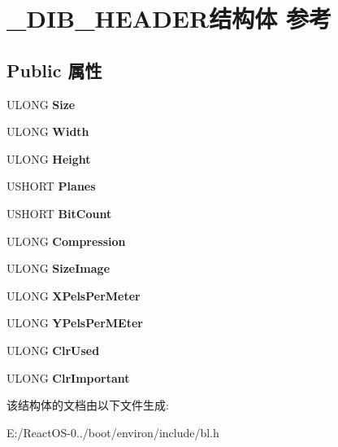 \hypertarget{struct___d_i_b___h_e_a_d_e_r}{}\section{\+\_\+\+D\+I\+B\+\_\+\+H\+E\+A\+D\+E\+R结构体 参考}
\label{struct___d_i_b___h_e_a_d_e_r}
\subsection*{Public 属性}
\begin{DoxyCompactItemize}
\item 
\mbox{\label{struct___d_i_b___h_e_a_d_e_r_a59eceb419299c2653e4a3de1f346e6e9}} 
U\+L\+O\+NG {\bfseries Size}
\item 
\mbox{\label{struct___d_i_b___h_e_a_d_e_r_a8619a5ef2ee396cfcb08ed5c5a59189c}} 
U\+L\+O\+NG {\bfseries Width}
\item 
\mbox{\label{struct___d_i_b___h_e_a_d_e_r_abc7f8dd6a1f5ee378e1c5ff10f09d081}} 
U\+L\+O\+NG {\bfseries Height}
\item 
\mbox{\label{struct___d_i_b___h_e_a_d_e_r_a678bb2df17adf2aee2a6169081722d53}} 
U\+S\+H\+O\+RT {\bfseries Planes}
\item 
\mbox{\label{struct___d_i_b___h_e_a_d_e_r_a022b41c6100c0a40f01766f009e289dd}} 
U\+S\+H\+O\+RT {\bfseries Bit\+Count}
\item 
\mbox{\label{struct___d_i_b___h_e_a_d_e_r_ac1772dcb3121d45213b8ac0814d25dab}} 
U\+L\+O\+NG {\bfseries Compression}
\item 
\mbox{\label{struct___d_i_b___h_e_a_d_e_r_ae2a991be26c2d27a9c8c19a6c65b5988}} 
U\+L\+O\+NG {\bfseries Size\+Image}
\item 
\mbox{\label{struct___d_i_b___h_e_a_d_e_r_a5c5fb3083e2e1869996e0e0f6341dc38}} 
U\+L\+O\+NG {\bfseries X\+Pels\+Per\+Meter}
\item 
\mbox{\label{struct___d_i_b___h_e_a_d_e_r_a50c6875c0e18a4cec43def83b7340a80}} 
U\+L\+O\+NG {\bfseries Y\+Pels\+Per\+M\+Eter}
\item 
\mbox{\label{struct___d_i_b___h_e_a_d_e_r_a4c2208726e7114cc5d041b173c248118}} 
U\+L\+O\+NG {\bfseries Clr\+Used}
\item 
\mbox{\label{struct___d_i_b___h_e_a_d_e_r_a376fab7ae09835119d5bf6a1df8df245}} 
U\+L\+O\+NG {\bfseries Clr\+Important}
\end{DoxyCompactItemize}


该结构体的文档由以下文件生成\+:\begin{DoxyCompactItemize}
\item 
E\+:/\+React\+O\+S-\/0../boot/environ/include/bl.\+h\end{DoxyCompactItemize}
